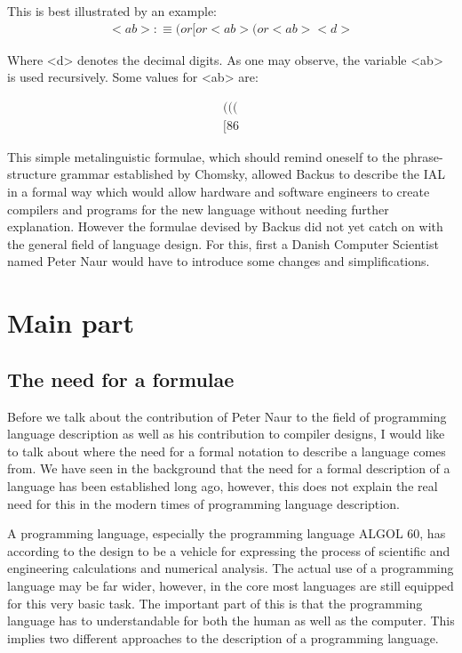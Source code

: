 \documentclass{article}
\begin{document}
This is best illustrated by an example:
\\
\begin{align*}
	<ab> : \equiv ( or [ or <ab>( or <ab><d>
\end{align*}

Where <d> denotes the decimal digits. As one may observe, the variable <ab> is used recursively. Some values for <ab> are:

\begin{align*}
	((( \\
	[86
\end{align*}

This simple metalinguistic formulae, which should remind oneself to the phrase-structure grammar established by Chomsky, allowed Backus to describe the IAL in a formal way which would allow hardware and software engineers to create compilers and programs for the new language without needing further explanation. However the formulae devised by Backus did not yet catch on with the general field of language design. For this, first a Danish Computer Scientist named Peter Naur would have to introduce some changes and simplifications. 

\section{Main part}

\subsection{The need for a formulae}
Before we talk about the contribution of Peter Naur to the field of programming language description as well as his contribution to compiler designs, I would like to talk about where the need for a formal notation to describe a language comes from. We have seen in the background that the need for a formal description of a language has been established long ago, however, this does not explain the real need for this in the modern times of programming language description. 

A programming language, especially the programming language ALGOL 60, has according to \cite{naur1963documentation} the design to be a vehicle for expressing the process of scientific and engineering calculations and numerical analysis. The actual use of a programming language may be far wider, however, in the core most languages are still equipped for this very basic task. The important part of this is that the programming language has to understandable for both the human as well as the computer. This implies two different approaches to the description of a programming language.
\end{document}
